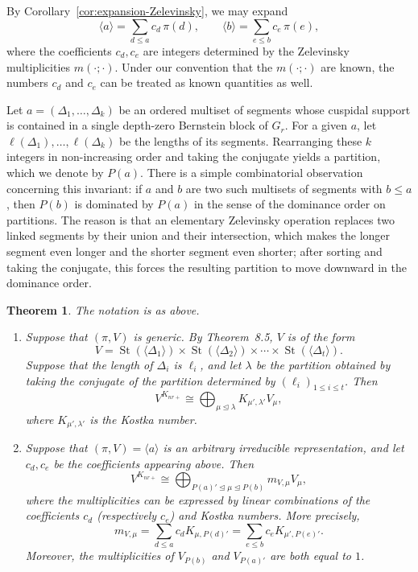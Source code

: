 \documentclass[12pt]{article}
\newtheorem{theorem}{Theorem}[section]
\theoremstyle{remark}
\begin{document}
By Corollary~\ref{cor:expansion-Zelevinsky}, we may expand
$$
\langle a \rangle = \sum_{d \le a} c_d \, \pi(d), \qquad
\langle b \rangle = \sum_{e \le b} c_e \, \pi(e),
$$
where the coefficients $c_d, c_e$ are integers determined by the Zelevinsky multiplicities $m(\cdot;\cdot)$. Under our convention that the $m(\cdot;\cdot)$ are known, the numbers $c_d$ and $c_e$ can be treated as known quantities as well.

Let $a = (\Delta_1,\dots,\Delta_k)$ be an ordered multiset of segments whose cuspidal support is contained in a single depth-zero Bernstein block of $G_r$. For a given $a$, let $\ell(\Delta_1),\dots,\ell(\Delta_k)$ be the lengths of its segments. Rearranging these $k$ integers in non-increasing order and taking the conjugate yields a partition, which we denote by $P(a)$. There is a simple combinatorial observation concerning this invariant: if $a$ and $b$ are two such multisets of segments with $b \le a$, then $P(b)$ is dominated by $P(a)$ in the sense of the dominance order on partitions. The reason is that an elementary Zelevinsky operation replaces two linked segments by their union and their intersection, which makes the longer segment even longer and the shorter segment even shorter; after sorting and taking the conjugate, this forces the resulting partition to move downward in the dominance order.

\begin{theorem}
\label{thm:main-decomposition}
The notation is as above.

\begin{enumerate}
\item[(a)]
Suppose that $(\pi,V)$ is generic. By Theorem~8.5,
$V$ is of the form
$$
V=\operatorname{St}(\langle\Delta_1\rangle)
\times\operatorname{St}(\langle\Delta_2\rangle)
\times\cdots\times
\operatorname{St}(\langle\Delta_t\rangle).
$$
Suppose that the length of $\Delta_i$ is $\ell_i$, and let
$\lambda$ be the partition obtained by taking the conjugate of
the partition determined by $(\ell_i)_{1\leq i\leq t}$.
Then
$$
V^{K_{nr+}}
\cong
\bigoplus_{\mu\unlhd\lambda}
K_{\mu',\lambda'}V_\mu,
$$
where $K_{\mu',\lambda'}$ is the Kostka number.

\item[(b)]
Suppose that $(\pi,V)=\langle a\rangle$ is an arbitrary
irreducible representation, and let $c_d,c_e$ be the
coefficients appearing above. Then
$$
V^{K_{nr+}}
\cong
\bigoplus_{P(a)'\unlhd\mu\unlhd P(b)}
m_{V,\mu}V_\mu,
$$
where the multiplicities can be expressed by linear combinations
of the coefficients $c_d$ (respectively $c_e$) and Kostka
numbers. More precisely,
$$
m_{V,\mu}
=
\sum_{d\leq a}c_dK_{\mu,P(d)'}
=
\sum_{e\leq b}c_eK_{\mu',P(e)'}.
$$
Moreover, the multiplicities of $V_{P(b)}$ and $V_{P(a)'}$ are
both equal to $1$.
\end{enumerate}
\end{theorem}
\end{document}
